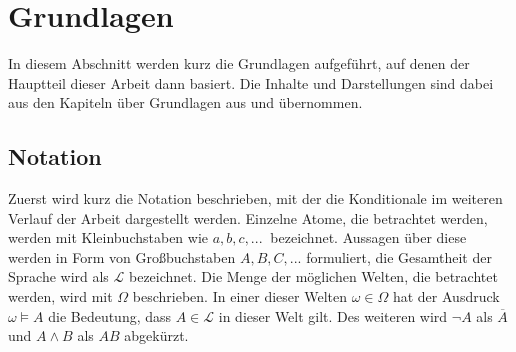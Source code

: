 \documentclass[12pt,a4paper]{article}
\newcommand{\lag}{\mathcal{L}}
\begin{document}
\section{Grundlagen}
In diesem Abschnitt werden kurz die Grundlagen aufgeführt, auf denen der Hauptteil dieser Arbeit dann basiert. Die Inhalte und Darstellungen sind dabei aus den Kapiteln über Grundlagen aus \cite{beierle19} und \cite{beierle17} übernommen.
\subsection{Notation}
Zuerst wird kurz die Notation beschrieben, mit der die Konditionale im weiteren Verlauf der Arbeit dargestellt werden. Einzelne Atome, die betrachtet werden, werden mit Kleinbuchstaben wie $a, b, c,...\ $ bezeichnet. Aussagen über diese werden in Form von Großbuchstaben $A, B, C,...$ formuliert, die Gesamtheit der Sprache wird als $\lag$ bezeichnet. Die Menge der möglichen Welten, die betrachtet werden, wird mit $\Omega$ beschrieben. In einer dieser Welten $\omega \in \Omega$  hat der Ausdruck $\omega \models A$ die Bedeutung, dass $A \in \lag$ in dieser Welt gilt. Des weiteren wird $\neg A$ als $\overline{A}$ und $A \wedge B$ als $AB$ abgekürzt.
\end{document}
